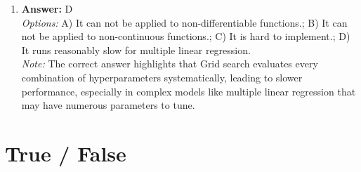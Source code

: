 \documentclass[12pt]{article}
\begin{document}
\begin{enumerate}[label=\arabic*.]
\item \textbf{Answer:} D
\\ \textit{Options:} A) It can not be applied to non-differentiable functions.; B) It can not be applied to non-continuous functions.; C) It is hard to implement.; D) It runs reasonably slow for multiple linear regression.
\\ \textit{Note:} The correct answer highlights that Grid search evaluates every combination of hyperparameters systematically, leading to slower performance, especially in complex models like multiple linear regression that may have numerous parameters to tune.
\end{enumerate}

\section*{True / False}
\end{document}
